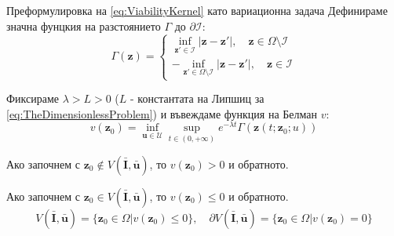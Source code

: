 \begin{frame}[t]{Преформулировка на \eqref{eq:ViabilityKernel} като вариационна задача}
  Дефинираме значна фунцкия на разстоянието $\Gamma$ до $\partial \mathscr{I}$:
  \begin{equation}
    \Gamma(\boldsymbol{z}) =
    \begin{cases}
      \inf_{\boldsymbol{z}' \in \mathscr{I}} |\boldsymbol{z}-\boldsymbol{z}'|, \quad \boldsymbol{z} \in \Omega \setminus \mathscr{I} \\
      -\inf_{\boldsymbol{z}' \in \Omega \setminus \mathscr{I}} |\boldsymbol{z}-\boldsymbol{z}'|, \quad \boldsymbol{z} \in \mathscr{I}
    \end{cases}
  \end{equation}

  Фиксираме $\lambda>L>0$ ($L$ - константата на Липшиц за \eqref{eq:TheDimensionlessProblem}) и въвеждаме функция на Белман $v$:
  \begin{equation}
    v(\boldsymbol{z}_0) = \inf_{\boldsymbol{u} \in \mathscr{U}} \sup_{t \in (0, +\infty)} e^{-\lambda t} \Gamma(\boldsymbol{z}(t; \boldsymbol{z}_0; u))
  \end{equation}

  Ако започнем с $\boldsymbol{z}_0 \notin V(\bar{\boldsymbol{I}}, \bar{\boldsymbol{u}})$, то $v(\boldsymbol{z}_0) > 0$ и обратното.

  Ако започнем с $\boldsymbol{z}_0 \in V(\bar{\boldsymbol{I}}, \bar{\boldsymbol{u}})$, то $v(\boldsymbol{z}_0) \leq 0$ и обратното.
  \begin{equation*}
    V(\bar{\boldsymbol{I}}, \bar{\boldsymbol{u}}) = \{\boldsymbol{z}_0 \in \Omega \vert v(\boldsymbol{z}_0) \leq 0\}, \quad \partial V(\bar{\boldsymbol{I}}, \bar{\boldsymbol{u}}) = \{\boldsymbol{z}_0 \in \Omega \vert v(\boldsymbol{z}_0) = 0\}
  \end{equation*}
\end{frame}

